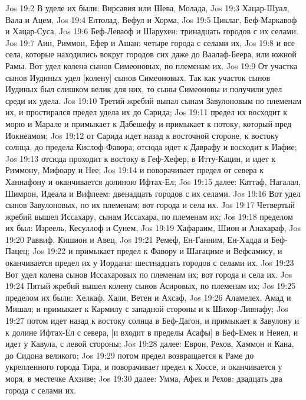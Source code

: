 \vs Jos 19:2 В уделе их были: Вирсавия или Шева, Молада,
\vs Jos 19:3 Хацар-Шуал, Вала и Ацем,
\vs Jos 19:4 Елтолад, Вефул и Хорма,
\vs Jos 19:5 Циклаг, Беф-Маркавоф и Хацар-Суса,
\vs Jos 19:6 Беф-Леваоф и Шарухен: тринадцать городов с их селами.
\vs Jos 19:7 Аин, Риммон, Ефер и Ашан: четыре города с селами их,
\vs Jos 19:8 и все села, которые находились вокруг городов сих даже до Ваалаф-Беера, или южной Рамы. Вот удел колена сынов Симеоновых, по племенам их.
\vs Jos 19:9 От участка сынов Иудиных  удел [колену] сынов Симеоновых. Так как участок сынов Иудиных был слишком велик для них, то сыны Симеоновы и получили удел среди их удела.
\vs Jos 19:10 Третий жребий выпал сынам Завулоновым по племенам их, и простирался предел удела их до Сарида;
\vs Jos 19:11 предел их восходит к морю и Марале и примыкает к Дабешефу и примыкает к потоку, который пред Иокнеамом;
\vs Jos 19:12 от Сарида идет назад к восточной стороне, к востоку солнца, до предела Кислоф-Фавора; отсюда идет к Даврафу и восходит к Иафие;
\vs Jos 19:13 отсюда проходит к востоку в Геф-Хефер, в Итту-Кацин, и идет к Риммону, Мифоару и Нее;
\vs Jos 19:14 и поворачивает предел от севера к Ханнафону и оканчивается долиною Ифтах-Ел;
\vs Jos 19:15 далее: Каттаф, Нагалал, Шимрон, Идеала и Вифлеем: двенадцать городов с их селами.
\vs Jos 19:16 Вот удел сынов Завулоновых, по их племенам; вот города и села их.
\rsbpar\vs Jos 19:17 Четвертый жребий вышел Иссахару, сынам Иссахара, по племенам их;
\vs Jos 19:18 пределом их был: Изреель, Кесуллоф и Сунем,
\vs Jos 19:19 Хафараим, Шион и Анахараф,
\vs Jos 19:20 Раввиф, Кишион и Авец,
\vs Jos 19:21 Ремеф, Ен-Ганним, Ен-Хадда и Беф-Пацец;
\vs Jos 19:22 и примыкает предел к Фавору и Шагациме и Вефсамису, и оканчивается предел их у Иордана: шестнадцать городов с селами их.
\vs Jos 19:23 Вот удел колена сынов Иссахаровых по племенам их; вот города и села их.
\rsbpar\vs Jos 19:24 Пятый жребий вышел колену сынов Асировых, по племенам их;
\vs Jos 19:25 пределом их были: Хелкаф, Хали, Ветен и Ахсаф,
\vs Jos 19:26 Аламелех, Амад и Мишал; и примыкает  к Кармилу с западной стороны и к Шихор-Ливнафу;
\vs Jos 19:27 потом идет назад к востоку солнца в Беф-Дагон, и примыкает к Завулону и к долине Ифтах-Ел с севера, [и входит в пределы Асафы] в Беф-Емек и Неиел, и идет у Кавула, с левой стороны;
\vs Jos 19:28 далее: Еврон, Рехов, Хаммон и Кана, до Сидона великого;
\vs Jos 19:29 потом предел возвращается к Раме до укрепленного города Тира, и поворачивает предел к Хоссе, и оканчивается у моря, в местечке Ахзиве;
\vs Jos 19:30 далее: Умма, Афек и Рехов: двадцать два города с селами их.

